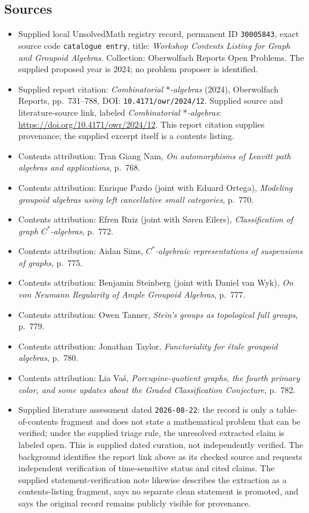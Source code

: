 \documentclass[11pt]{article}
\begin{document}
\subsection{Sources}
\begin{itemize}
\item Supplied local UnsolvedMath registry record, permanent ID \texttt{30005843}, exact source code \texttt{catalogue entry}, title: \emph{Workshop Contents Listing for Graph and Groupoid Algebras}. Collection: Oberwolfach Reports Open Problems. The supplied proposed year is 2024; no problem proposer is identified.
\item Supplied report citation: \emph{Combinatorial $*$-algebras} (2024), Oberwolfach Reports, pp.~731--788, DOI: \texttt{10.4171/owr/2024/12}. Supplied source and literature-source link, labeled \emph{Combinatorial $*$-algebras}: \url{https://doi.org/10.4171/owr/2024/12}. This report citation supplies provenance; the supplied excerpt itself is a contents listing.
\item Contents attribution: Tran Giang Nam, \emph{On automorphisms of Leavitt path algebras and applications}, p.~768.
\item Contents attribution: Enrique Pardo (joint with Eduard Ortega), \emph{Modeling groupoid algebras using left cancellative small categories}, p.~770.
\item Contents attribution: Efren Ruiz (joint with Søren Eilers), \emph{Classification of graph $C^*$-algebras}, p.~772.
\item Contents attribution: Aidan Sims, \emph{$C^*$-algebraic representations of suspensions of graphs}, p.~775.
\item Contents attribution: Benjamin Steinberg (joint with Daniel van Wyk), \emph{On von Neumann Regularity of Ample Groupoid Algebras}, p.~777.
\item Contents attribution: Owen Tanner, \emph{Stein's groups as topological full groups}, p.~779.
\item Contents attribution: Jonathan Taylor, \emph{Functoriality for étale groupoid algebras}, p.~780.
\item Contents attribution: Lia Vaš, \emph{Porcupine-quotient graphs, the fourth primary color, and some updates about the Graded Classification Conjecture}, p.~782.
\item Supplied literature assessment dated \texttt{2026-08-22}: the record is only a table-of-contents fragment and does not state a mathematical problem that can be verified; under the supplied triage rule, the unresolved extracted claim is labeled open. This is supplied dated curation, not independently verified. The background identifies the report link above as its checked source and requests independent verification of time-sensitive status and cited claims. The supplied statement-verification note likewise describes the extraction as a contents-listing fragment, says no separate clean statement is promoted, and says the original record remains publicly visible for provenance.
\end{itemize}
\end{document}
